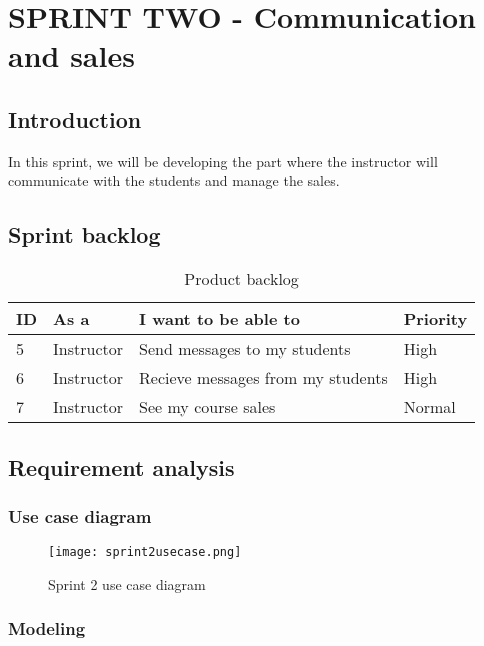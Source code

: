 \chapter{SPRINT TWO - Communication and sales}
\minitoc
\newpage
\section*{Introduction}
In this sprint, we will be developing the part where the instructor will communicate with the students and manage the sales.
\section{Sprint backlog}
\begin{table}[H]
\centering
\caption{Product backlog}
\begin{tabular}{|p{1cm}|p{3cm}|p{6cm}|p{2cm}|}
\hline
\rowcolor{brown!18}\textbf{\large{ID}} & \textbf{\large{As a}} & \textbf{\large{I want to be able to}} & \textbf{\large{Priority}} \\
\hline
5& Instructor & Send messages to my students & High\\\hline
6& Instructor & Recieve messages from my students  & High\\\hline
7& Instructor  & See my course sales & Normal \\\hline
\end{tabular}
\end{table}
\section{Requirement analysis}
\subsection{Use case diagram}

\begin{figure}[!ht]
    \centering
    \texttt{[image: sprint2usecase.png]}
    \caption{Sprint 2 use case diagram}
    \label{fig:sprint2usecase}
\end{figure}




\subsection{Modeling}

